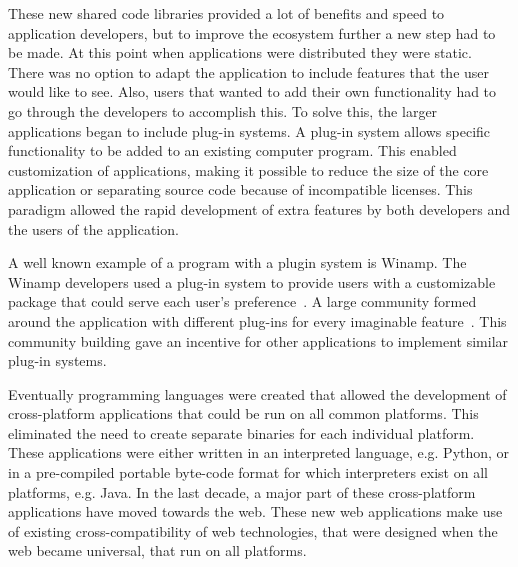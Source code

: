 
These new shared code libraries provided a lot of benefits and speed to application developers, but to improve the ecosystem further a new step had to be made. At this point when applications were distributed they were static. There was no option to adapt the application to include features that the user would like to see. Also, users that wanted to add their own functionality had to go through the developers to accomplish this. To solve this, the larger applications began to include plug-in systems. A plug-in system allows specific functionality to be added to an existing computer program. This enabled customization of applications, making it possible to reduce the size of the core application or separating source code because of incompatible licenses. This paradigm allowed the rapid development of extra features by both developers and the users of the application.

A well known example of a program with a plugin system is Winamp. The Winamp developers used a plug-in system to provide users with a customizable package that could serve each user's preference~\cite{nullsoft1999winamp}. A large community formed around the application with different plug-ins for every imaginable feature~\cite{winampcommunity}. This community building gave an incentive for other applications to implement similar plug-in systems.

Eventually programming languages were created that allowed the development of cross-platform applications that could be run on all common platforms. This eliminated the need to create separate binaries for each individual platform. These applications were either written in an interpreted language, e.g. Python, or in a pre-compiled portable byte-code format for which interpreters exist on all platforms, e.g. Java. In the last decade, a major part of these cross-platform applications have moved towards the web. These new web applications make use of existing cross-compatibility of web technologies, that were designed when the web became universal, that run on all platforms.

